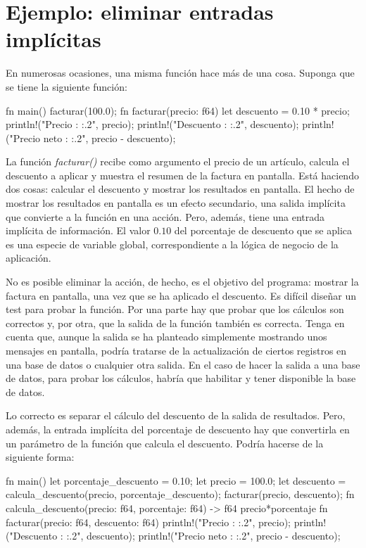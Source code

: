 \section{Ejemplo: eliminar entradas implícitas}
\noindent En numerosas ocasiones, una misma función hace más de una cosa. Suponga que se tiene la siguiente función:

\vspace{0.7em}
\begin{Codigo}
   fn main() {
      facturar(100.0);
   }
   fn facturar(precio: f64) {
      let descuento = 0.10 * precio;
      println!("Precio      : {:.2}", precio);
      println!("Descuento   : {:.2}", descuento);
      println!("Precio neto : {:.2}", precio - descuento);
   }
\end{Codigo}

La función \textit{facturar()} recibe como argumento el precio de un artículo, calcula el descuento a aplicar y muestra el resumen de la factura en pantalla. Está haciendo dos cosas: calcular el descuento y mostrar los resultados en pantalla. El hecho de mostrar los resultados en pantalla es un efecto secundario, una salida implícita que convierte a la función en una acción. Pero, además, tiene una entrada implícita de información. El valor $0.10$ del porcentaje de descuento que se aplica es una especie de variable global, correspondiente a la lógica de negocio de la aplicación.

No es posible eliminar la acción, de hecho, es el objetivo del programa: mostrar la factura en pantalla, una vez que se ha aplicado el descuento. Es difícil diseñar un test para probar la función. Por una parte hay que probar que los cálculos son correctos y, por otra, que la salida de la función también es correcta. Tenga en cuenta que, aunque la salida se ha planteado simplemente mostrando unos mensajes en pantalla, podría tratarse de la actualización de ciertos registros en una base de datos o cualquier otra salida. En el caso de hacer la salida a una base de datos, para probar los cálculos, habría que habilitar y tener disponible la base de datos.

Lo correcto es separar el cálculo del descuento de la salida de resultados. Pero, además, la entrada implícita del porcentaje de descuento hay que convertirla en un parámetro de la función que calcula el descuento. Podría hacerse de la siguiente forma:

\vspace{0.7em}
\begin{Codigo}
   fn main() {
      let porcentaje_descuento = 0.10;
      let precio = 100.0;
      let descuento = 
      calcula_descuento(precio, porcentaje_descuento);
      facturar(precio, descuento);
   }
   fn calcula_descuento(precio: f64, porcentaje: f64) -> f64 {
      precio*porcentaje
   }
   fn facturar(precio: f64, descuento: f64) {
      println!("Precio      : {:.2}", precio);
      println!("Descuento   : {:.2}", descuento);
      println!("Precio neto : {:.2}", precio - descuento);
   }
\end{Codigo}

